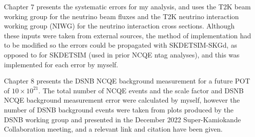 Chapter 7 presents the systematic errors for my analysis, and uses the T2K beam working group for the neutrino beam fluxes and the T2K neutrino interaction working group (NIWG) for the neutrino interaction cross sections. Although these inputs were taken from external sources, the method of implementation had to be modified so the errors could be propagated with SKDETSIM-SKGd, as opposed to for SKDETSIM (used in prior NCQE ntag analyses), and this was implemented for each error by myself. 

Chapter 8 presents the DSNB NCQE background measurement for a future POT of $10 \times 10^{21}$. The total number of NCQE events and the scale factor and DSNB NCQE background measurement error were calculated by myself, however the number of DSNB background events were taken from plots produced by the DSNB working group and presented in the December 2022 Super-Kamiokande Collaboration meeting, and a relevant link and citation have been given. 